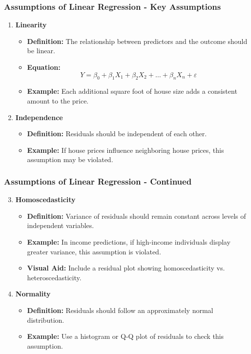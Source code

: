\documentclass[aspectratio=169]{beamer}
\begin{document}
\begin{frame}[fragile]
    \frametitle{Assumptions of Linear Regression - Key Assumptions}
    \begin{enumerate}
        \item \textbf{Linearity}
        \begin{itemize}
            \item \textbf{Definition:} The relationship between predictors and the outcome should be linear.
            \item \textbf{Equation:} 
            \begin{equation}
                Y = \beta_0 + \beta_1X_1 + \beta_2X_2 + \ldots + \beta_nX_n + \varepsilon
            \end{equation}
            \item \textbf{Example:} Each additional square foot of house size adds a consistent amount to the price.
        \end{itemize}

        \item \textbf{Independence}
        \begin{itemize}
            \item \textbf{Definition:} Residuals should be independent of each other.
            \item \textbf{Example:} If house prices influence neighboring house prices, this assumption may be violated.
        \end{itemize}
    \end{enumerate}
\end{frame}

\begin{frame}[fragile]
    \frametitle{Assumptions of Linear Regression - Continued}
    \begin{enumerate}
        \setcounter{enumi}{2}
        \item \textbf{Homoscedasticity}
        \begin{itemize}
            \item \textbf{Definition:} Variance of residuals should remain constant across levels of independent variables.
            \item \textbf{Example:} In income predictions, if high-income individuals display greater variance, this assumption is violated.
            \item \textbf{Visual Aid:} Include a residual plot showing homoscedasticity vs. heteroscedasticity.
        \end{itemize}

        \item \textbf{Normality}
        \begin{itemize}
            \item \textbf{Definition:} Residuals should follow an approximately normal distribution.
            \item \textbf{Example:} Use a histogram or Q-Q plot of residuals to check this assumption.
        \end{itemize}
    \end{enumerate}
\end{frame}
\end{document}
